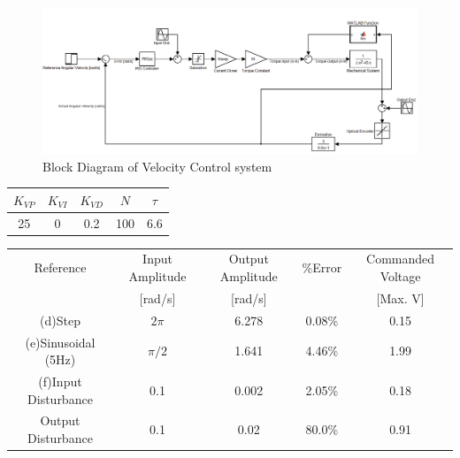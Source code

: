 \documentclass{article}
\theoremstyle{plain}
\theoremstyle{definition}
\theoremstyle{remark}
\begin{document}
\begin{figure}[htb]
\begin{center}
\includegraphics[height = 8 cm, width = 18 cm]{q3_11}
\caption{Block Diagram of Velocity Control system}
\label{q3_11}
\end{center}
\end{figure}

\begin{table}[htb]
\begin{center}
    \begin{tabular}{|c|c|c|c|c|}
        \hline
        $K_{VP}$ & $K_{VI}$ & $K_{VD}$ & $N$ & $\tau$ \\ \hline
        25       & 0        & 0.2      & 100 & 6.6    \\
        \hline
    \end{tabular}
\end{center}
\end{table}

\begin{table}[htb]
\begin{center}
    \begin{tabular}{|c|c|c|c|c|}
        \hline
        Reference            & Input Amplitude & Output Amplitude & \%Error & Commanded Voltage \\ 
        ~                    & [rad/s]                 & [rad/s]                  & ~       & [Max. V]                   \\ \hline
        (d)Step              & $2\pi$                  & 6.278                    & 0.08\%  & 0.15                       \\ 
        (e)Sinusoidal (5Hz)        & $\pi/2$                 & 1.641                    & 4.46\%  & 1.99                       \\ 
        (f)Input Disturbance & 0.1                     & 0.002                    & 2.05\%  & 0.18                       \\ 
        Output Disturbance   & 0.1                     & 0.02                     & 80.0\%  & 0.91                       \\
        \hline
    \end{tabular}
\end{center}
\end{table}
\end{document}
